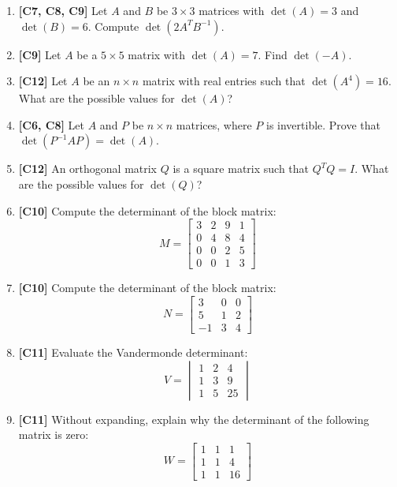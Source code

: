 \documentclass[11pt]{article}
\begin{document}
\begin{enumerate}
    \item \textbf{[C7, C8, C9]} Let $A$ and $B$ be $3 \times 3$ matrices with $\det(A) = 3$ and $\det(B) = 6$. Compute $\det(2 A^T B^{-1})$.

    \item \textbf{[C9]} Let $A$ be a $5 \times 5$ matrix with $\det(A) = 7$. Find $\det(-A)$.

    \item \textbf{[C12]} Let $A$ be an $n \times n$ matrix with real entries such that $\det(A^4) = 16$. What are the possible values for $\det(A)$?

    \item \textbf{[C6, C8]} Let $A$ and $P$ be $n \times n$ matrices, where $P$ is invertible. Prove that $\det(P^{-1}AP) = \det(A)$.

    \item \textbf{[C12]} An orthogonal matrix $Q$ is a square matrix such that $Q^T Q = I$. What are the possible values for $\det(Q)$?

    \item \textbf{[C10]} Compute the determinant of the block matrix:
    \[ M = \begin{bmatrix} 3 & 2 & 9 & 1 \\ 0 & 4 & 8 & 4 \\ 0 & 0 & 2 & 5 \\ 0 & 0 & 1 & 3 \end{bmatrix} \]

    \item \textbf{[C10]} Compute the determinant of the block matrix:
    \[ N = \begin{bmatrix} 3 & 0 & 0 \\ 5 & 1 & 2 \\ -1 & 3 & 4 \end{bmatrix} \]

    \item \textbf{[C11]} Evaluate the Vandermonde determinant:
    \[ V = \begin{vmatrix} 1 & 2 & 4 \\ 1 & 3 & 9 \\ 1 & 5 & 25 \end{vmatrix} \]

    \item \textbf{[C11]} Without expanding, explain why the determinant of the following matrix is zero:
    \[ W = \begin{bmatrix} 1 & 1 & 1 \\ 1 & 1 & 4 \\ 1 & 1 & 16 \end{bmatrix} \]


\end{enumerate}
\end{document}
